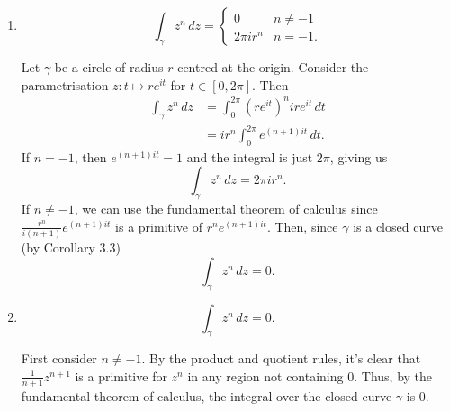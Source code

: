 \documentclass[12 pt, letterpaper]{hmcpset}
\begin{document}
\begin{solution}
	\begin{enumerate}
		\item 
			\[
				\boxed{
					\int_{\gamma} z^{n} \, dz = \begin{cases}
						0 & n \neq -1 \\
						2 \pi i r^{n} & n = -1.
					\end{cases}
				}
			\]

			Let $\gamma$ be a circle of radius $r$ centred at the origin. Consider the parametrisation $z : t \mapsto r e^{i t}$ for $t \in [0, 2 \pi]$. Then
			\[
				\begin{split}
					\int_{\gamma} z^{n} \, dz & = \int_{0}^{2 \pi} (r e^{i t})^{n} ir e^{it} \, dt \\
								  & = i r^{n} \int_{0}^{2 \pi} e^{(n + 1) i t} \, dt.
				\end{split}
			\]
			If $n = -1$, then $e^{(n + 1) i t} = 1$ and the integral is just $2 \pi$, giving us
			\[
				\int_{\gamma} z^{n} \, dz = 2 \pi i r^{n}.
			\]
			If $n \neq -1$, we can use the fundamental theorem of calculus since $\frac{r^{n}}{i(n + 1)} e^{(n + 1) i t}$ is a primitive of $r^{n} e^{(n + 1) i t}$. Then, since $\gamma$ is a closed curve (by Corollary 3.3)
			\[
				\int_{\gamma} z^{n} \, dz = 0.
			\]
		\item
			\[
				\boxed{
					\int_{\gamma} z^{n} \, dz = 0.
				}
			\]

			First consider $n \neq -1$. By the product and quotient rules, it's clear that $\frac{1}{n + 1} z^{n + 1}$ is a primitive for $z^{n}$ in any region not containing $0$. Thus, by the fundamental theorem of calculus, the integral over the closed curve $\gamma$ is $0$.


\end{enumerate}
\end{solution}
\end{document}
